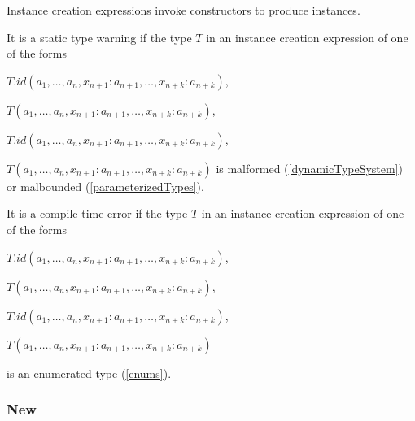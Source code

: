 \documentclass{article}
\begin{document}
\LMHash{}
Instance creation expressions invoke constructors to produce instances. 



\LMHash{}
It is a static type warning if
the type $T$ in an instance creation expression of one of  the forms 

\NEW{} $T.id(a_1, \ldots , a_n, x_{n+1}: a_{n+1}, \ldots , x_{n+k}: a_{n+k})$,  

\NEW{} $T(a_1, \ldots , a_n, x_{n+1}: a_{n+1}, \ldots , x_{n+k}: a_{n+k})$,

\CONST{} $T.id(a_1, \ldots , a_n, x_{n+1}: a_{n+1}, \ldots , x_{n+k}: a_{n+k})$,  

\CONST{} $T(a_1, \ldots , a_n, x_{n+1}: a_{n+1}, \ldots , x_{n+k}: a_{n+k})$ is malformed (\ref{dynamicTypeSystem}) or malbounded (\ref{parameterizedTypes}).

\LMHash{}
It is a compile-time error if the type $T$ in an instance creation expression of one of the forms 

\NEW{} $T.id(a_1, \ldots , a_n, x_{n+1}: a_{n+1}, \ldots , x_{n+k}: a_{n+k})$,  

\NEW{} $T(a_1, \ldots , a_n, x_{n+1}: a_{n+1}, \ldots , x_{n+k}: a_{n+k})$,

\CONST{} $T.id(a_1, \ldots , a_n, x_{n+1}: a_{n+1}, \ldots , x_{n+k}: a_{n+k})$,  

\CONST{} $T(a_1, \ldots , a_n, x_{n+1}: a_{n+1}, \ldots , x_{n+k}: a_{n+k})$ 

is an enumerated type (\ref{enums}).


\subsubsection{ New}
\end{document}
